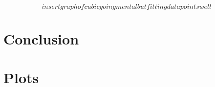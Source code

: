 \documentclass[a4paper]{article}
\numberwithin{equation}{section}
\begin{document}
$$ insert graph of cubic going mental but fitting data points well$$






\newpage
\section{Conclusion}











\newpage
\appendix{}
\section{Plots}



\newpage
%


{}

\end{document}
